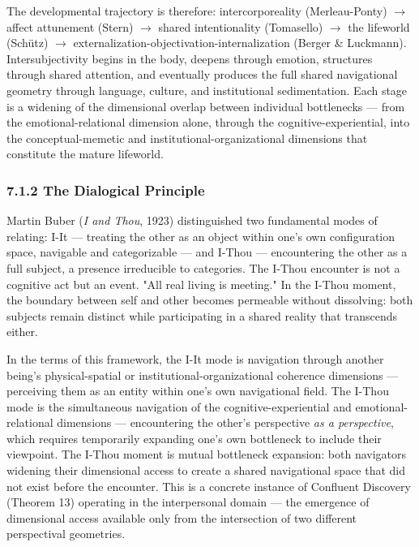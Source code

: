 The developmental trajectory is therefore: intercorporeality (Merleau-Ponty) $\rightarrow$ affect attunement (Stern) $\rightarrow$ shared intentionality (Tomasello) $\rightarrow$ the lifeworld (Schütz) $\rightarrow$ externalization-objectivation-internalization (Berger \& Luckmann). Intersubjectivity begins in the body, deepens through emotion, structures through shared attention, and eventually produces the full shared navigational geometry through language, culture, and institutional sedimentation. Each stage is a widening of the dimensional overlap between individual bottlenecks — from the emotional-relational dimension alone, through the cognitive-experiential, into the conceptual-memetic and institutional-organizational dimensions that constitute the mature lifeworld.


\subsubsection*{7.1.2 The Dialogical Principle}


Martin Buber (\textit{I and Thou}, 1923) distinguished two fundamental modes of relating: I-It — treating the other as an object within one's own configuration space, navigable and categorizable — and I-Thou — encountering the other as a full subject, a presence irreducible to categories. The I-Thou encounter is not a cognitive act but an event. "All real living is meeting." In the I-Thou moment, the boundary between self and other becomes permeable without dissolving: both subjects remain distinct while participating in a shared reality that transcends either.


In the terms of this framework, the I-It mode is navigation through another being's physical-spatial or institutional-organizational coherence dimensions — perceiving them as an entity within one's own navigational field. The I-Thou mode is the simultaneous navigation of the cognitive-experiential and emotional-relational dimensions — encountering the other's perspective \textit{as a perspective}, which requires temporarily expanding one's own bottleneck to include their viewpoint. The I-Thou moment is mutual bottleneck expansion: both navigators widening their dimensional access to create a shared navigational space that did not exist before the encounter. This is a concrete instance of Confluent Discovery (Theorem 13) operating in the interpersonal domain — the emergence of dimensional access available only from the intersection of two different perspectival geometries.


